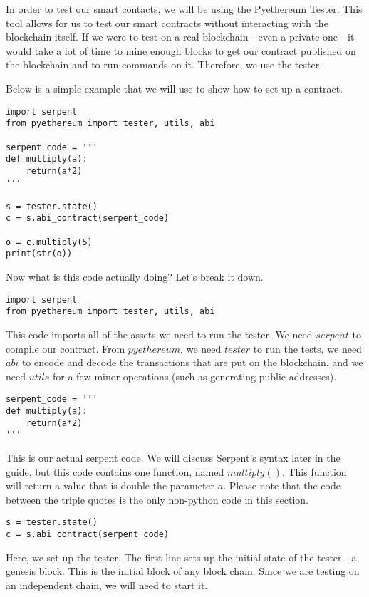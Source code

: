 \documentclass[12pt]{article}
\begin{document}
In order to test our smart contacts, we will be using the Pyethereum Tester. This tool allows for us to test our smart contracts without interacting with the blockchain itself. If we were to test on a real blockchain - even a private one - it would take a lot of time to mine enough blocks to get our contract published on the blockchain and to run commands on it. Therefore, we use the tester.

Below is a simple example that we will use to show how to set up a contract. \cite{test_contracts.py,Usingpyethereum.tester}

\begin{mdframed}
\begin{verbatim}
import serpent
from pyethereum import tester, utils, abi

serpent_code = '''
def multiply(a):
	return(a*2)
'''

s = tester.state()
c = s.abi_contract(serpent_code)

o = c.multiply(5)
print(str(o))
\end{verbatim}
\end{mdframed}

Now what is this code actually doing? Let's break it down.

\begin{verbatim}
import serpent
from pyethereum import tester, utils, abi
\end{verbatim}

This code imports all of the assets we need to run the tester. We need $serpent$ to compile our contract. From $pyethereum$, we need $tester$ to run the tests, we need $abi$ to encode and decode the transactions that are put on the blockchain, and we need $utils$ for a few minor operations (such as generating public addresses).

\begin{verbatim}
serpent_code = '''
def multiply(a):
	return(a*2)
'''
\end{verbatim}

This is our actual serpent code. We will discuss Serpent's syntax later in the guide, but this code contains one function, named $multiply()$. This function will return a value that is double the parameter $a$. Please note that the code between the triple quotes is the only non-python code in this section.

\begin{verbatim}
s = tester.state()
c = s.abi_contract(serpent_code)
\end{verbatim}
Here, we set up the tester. The first line sets up the initial state of the tester - a genesis block. This is the initial block of any block chain. Since we are testing on an independent chain, we will need to start it. 
\end{document}
